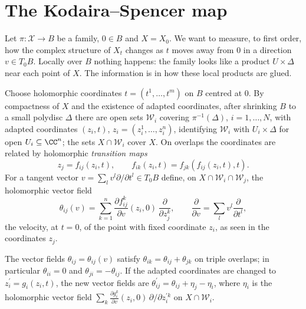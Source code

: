 \section{The Kodaira--Spencer map}\label{deformations:section-kodaira-spencer}

Let $\pi \colon \mathcal{X} \to B$ be a family, $0 \in B$ and $X = X_0$. We want to measure, to first order, how the complex structure of $X_t$ changes as $t$ moves away from $0$ in a direction $v \in T_0B$. Locally
over $B$ nothing happens: the family looks like a product $U \times \Delta$ near each point of $X$. The information is in how these local products are glued.

Choose holomorphic coordinates $t = (t^1, \ldots, t^m)$ on $B$ centred at $0$. By compactness of $X$ and the existence of adapted coordinates, after shrinking $B$ to a small polydisc $\Delta$ there are open
sets $\mathcal{W}_i$ covering $\pi^{-1}(\Delta)$, $i = 1, \ldots, N$, with adapted coordinates $(z_i, t)$, $z_i = (z_i^1, \ldots, z_i^n)$, identifying $\mathcal{W}_i$ with $U_i \times \Delta$ for open
$U_i \subseteq \CC^n$; the sets $X \cap \mathcal{W}_i$ cover $X$. On overlaps the coordinates are related by holomorphic \emph{transition maps}
\[
z_j = f_{ij}(z_i, t), \qquad f_{ik}(z_i, t) = f_{jk}(f_{ij}(z_i, t), t).
\]
For a tangent vector $v = \sum_lv^l\partial/\partial t^l \in T_0B$ define, on $X \cap \mathcal{W}_i \cap \mathcal{W}_j$, the holomorphic vector field
\[
\theta_{ij}(v) = \sum_{k=1}^n\frac{\partial f_{ij}^k}{\partial v}(z_i, 0)\,\frac{\partial}{\partial z_j^k}, \qquad \frac{\partial}{\partial v} = \sum_lv^l\frac{\partial}{\partial t^l},
\]
the velocity, at $t = 0$, of the point with fixed coordinate $z_i$, as seen in the coordinates $z_j$.

\begin{lemma}\label{deformations:lemma-kodaira-spencer-cocycle}
The vector fields $\theta_{ij} = \theta_{ij}(v)$ satisfy $\theta_{ik} = \theta_{ij} + \theta_{jk}$ on triple overlaps; in particular $\theta_{ii} = 0$ and $\theta_{ji} = -\theta_{ij}$. If the adapted coordinates are
changed to $z_i^{\prime} = g_i(z_i, t)$, the new vector fields are $\theta_{ij}^{\prime} = \theta_{ij} + \eta_j - \eta_i$, where $\eta_i$ is the holomorphic vector field $\sum_k\frac{\partial g_i^k}{\partial v}(z_i, 0)\,\partial/\partial z_i^{\prime k}$
on $X \cap \mathcal{W}_i$.
\end{lemma}

